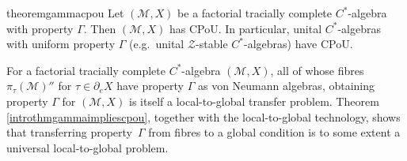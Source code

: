 \documentclass[a4paper,11pt]{amsart}
\theoremstyle{definition}
\numberwithin{equation}{section}
\numberwithin{theorem}{section}
\newcommand{\Z}{\mathcal Z}
\newcommand{\M}{\mathcal{M}}
\begin{document}
\begin{restatable}{theorem}{gammacpou}
\label{introthmgammaimpliescpou}
Let $(\M,X)$ be a factorial tracially complete $C^*$-algebra with property $\Gamma$.  Then $(\M,X)$ has CPoU.  In particular, unital $C^*$-algebras with uniform property $\Gamma$ (e.g.\ unital $\Z$-stable $C^*$-algebras) have CPoU.
\end{restatable}

For a factorial tracially complete $C^*$-algebra $(\M,X)$, all of whose fibres $\pi_\tau(\M)''$ for $\tau \in \partial_e X$ have property $\Gamma$ as von Neumann algebras, obtaining property $\Gamma$ for $(\M,X)$ is itself a local-to-global transfer problem.  Theorem \ref{introthmgammaimpliescpou}, together with the local-to-global technology, shows that transferring property~$\Gamma$ from fibres to a global condition is to some extent a universal local-to-global problem.
\end{document}
